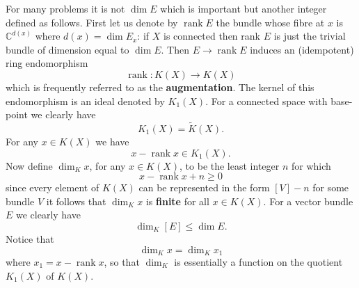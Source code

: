 \documentclass[leqno]{book}
\numberwithin{equation}{section}
\theoremstyle{definition}
\renewcommand{\emph}{\textbf}
\begin{document}
            For many problems it is not $\operatorname{dim}E$ which is important but another integer defined as follows. First let us denote by $\operatorname{rank}E$ the bundle whose fibre at $x$ is $\mathbb{C}^{d(x)}$ where $d(x)=\operatorname{dim}E_{x}$: if $X$ is connected then rank $E$ is just the trivial bundle of dimension equal to $\operatorname{dim}E$. Then $E\to \operatorname{rank}E$ induces an (idempotent) ring endomorphism
            \begin{equation*}
              \operatorname{rank}:K(X)\to K(X)
            \end{equation*}
            which is frequently referred to as the \emph{augmentation}. The kernel of this endomorphism is an ideal denoted by $K_{1}(X)$. For a connected space with base-point we clearly have
            \begin{equation*}
              K_{1}(X)=\tilde{K}(X).
            \end{equation*}
            For any $x\in K(X)$ we have
            \begin{equation*}
              x-\operatorname{rank}x \in K_{1}(X).
            \end{equation*}
            Now define $\operatorname{dim}_{K}x$, for any $x\in K(X)$, to be the least integer $n$ for which
            \begin{equation*}
              x-\operatorname{rank}x+n\ge 0
            \end{equation*}
            since every element of $K(X)$ can be represented in the form $[V]-n$ for some bundle $V$ it follows that $\operatorname{dim}_{K}x$ is \emph{finite} for all $x\in K(X)$. For a vector bundle $E$ we clearly have
            \begin{equation*}
              \operatorname{dim}_{K}[E]\le \operatorname{dim}E.
            \end{equation*}
            Notice that 
            \begin{equation*}
              \operatorname{dim}_{K} x=\operatorname{dim}_{K}x_{1}
            \end{equation*}
            where $x_{1}=x-\operatorname{rank}x$, so that $\operatorname{dim}_{K}$ is essentially a function on the quotient $K_{1}(X)$ of $K(X)$.
\end{document}
